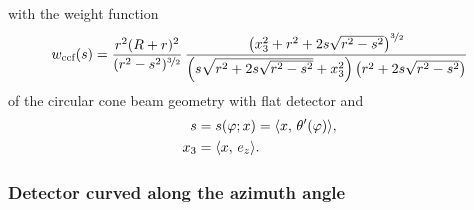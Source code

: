 \documentclass{amsart}
\renewcommand*{\phi}{\varphi}
\begin{document}
%
with the weight function
%
\begin{equation}
 \label{eq:coneflat:backproj_weight}
 w_{\text{ccf}}(s) =\frac{r^2(R+r)^2}{(r^2-s^2)^{\nicefrac{3}{2}}}\, 
 \frac{\big(x_3^2 + r^2 + 2s\sqrt{r^2-s^2}\big)^{\nicefrac{3}{2}}}{\left( s \sqrt{r^2 + 2s\sqrt{r^2-s^2}} + x_3^2 \right)
 \left( r^2 + 2s\sqrt{r^2-s^2} \right)}
\end{equation} 
%
of the circular cone beam geometry with flat detector and
%
\begin{align}
 s &= s(\phi; x) = \INNER{x}{\theta'(\phi)}, \\
 x_3 &= \INNER{x}{e_z}.
\end{align}
%
\vspace{5ex}



\subsubsection{Detector curved along the azimuth angle}
\label{sec:applications:cone_circular:curvedstack}
\end{document}
